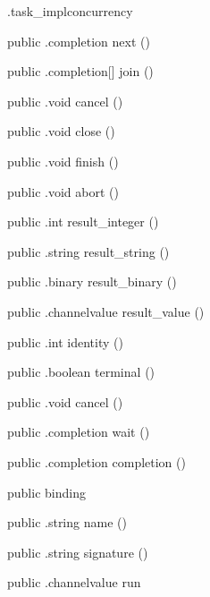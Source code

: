 \begin{CrexxClass}{.task\_impl}{concurrency}
\begin{Members}
    \Method
      {public}
      {.completion}
      {next}
      {()}

    \Method
      {public}
      {.completion[]}
      {join}
      {()}

    \Method
      {public}
      {.void}
      {cancel}
      {()}

    \Method
      {public}
      {.void}
      {close}
      {()}

    \Method
      {public}
      {.void}
      {finish}
      {()}

    \Method
      {public}
      {.void}
      {abort}
      {()}

    \Method
      {public}
      {.int}
      {result\_integer}
      {()}

    \Method
      {public}
      {.string}
      {result\_string}
      {()}

    \Method
      {public}
      {.binary}
      {result\_binary}
      {()}

    \Method
      {public}
      {.channelvalue}
      {result\_value}
      {()}

    \Method
      {public}
      {.int}
      {identity}
      {()}

    \Method
      {public}
      {.boolean}
      {terminal}
      {()}

    \Method
      {public}
      {.void}
      {cancel}
      {()}

    \Method
      {public}
      {.completion}
      {wait}
      {()}

    \Method
      {public}
      {.completion}
      {completion}
      {()}

    \Factory
      {public}
      {binding}
      {}

    \Method
      {public}
      {.string}
      {name}
      {()}

    \Method
      {public}
      {.string}
      {signature}
      {()}

    \Method
      {public}
      {.channelvalue}
      {run}
      {}


\end{Members}
\end{CrexxClass}

